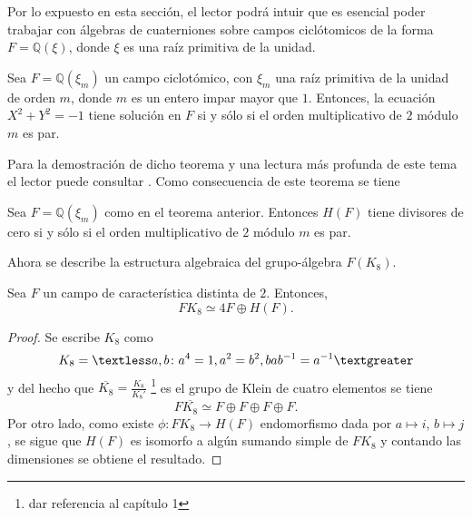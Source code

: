 Por lo expuesto en esta sección, el lector podrá intuir que es esencial poder trabajar con álgebras de cuaterniones sobre campos ciclótomicos de la forma $F = \mathds{Q}(\xi)$, donde $\xi$ es una raíz primitiva de la unidad. 

\begin{teorema}
Sea $F = \mathds{Q}(\xi_m)$ un campo ciclotómico, con $\xi_m$ una raíz primitiva de la unidad de orden $m$, donde $m$ es un entero impar mayor que $1$. Entonces, la ecuación $X^2 + Y^2 = -1$ tiene solución en $F$ si y sólo si el orden multiplicativo de $2$ módulo $m$ es par.
\end{teorema}

Para la demostración de dicho teorema y una lectura más profunda de este tema el lector puede consultar \cite{bib:moser}. Como consecuencia de este teorema se tiene
\begin{lema}
Sea $F = \mathds{Q}(\xi_m)$ como en el teorema anterior. Entonces $H(F)$ tiene divisores de cero si y sólo si el orden multiplicativo de $2$ módulo $m$ es par.
\end{lema}

Ahora se describe la estructura algebraica del grupo-álgebra $F(K_8)$.

\begin{lema}\label{lem:K8}
Sea $F$ un campo de característica distinta de $2 $. Entonces,
\begin{equation*}
FK_8 \simeq 4F\oplus H(F).
\end{equation*}
\end{lema}
\begin{proof}
Se escribe $K_8$ como
\begin{equation*}
K_8 = \textless a, b \colon a^4 = 1, a^2 = b^2, bab^{-1} = a^{-1} \textgreater
\end{equation*}
y del hecho que $\overline{K_8} = \frac{K_8}{K_8'}$ \footnote{dar referencia al capítulo 1} es el grupo de Klein de cuatro elementos se tiene
\begin{equation*}
F\overline{K_8} \simeq F \oplus F \oplus F \oplus F.
\end{equation*}
Por otro lado, como existe $\phi \colon FK_8 \to H(F)$ endomorfismo dada por $a \mapsto i$, $b \mapsto j$, se sigue que $H(F)$ es isomorfo a algún sumando simple de $FK_8$ y contando las dimensiones se obtiene el resultado. 
\end{proof}

